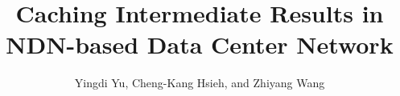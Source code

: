 \documentclass[journal]{IEEEtran}
\begin{document}
\title{Caching Intermediate Results in NDN-based Data Center Network}

\author{Yingdi Yu,
  Cheng-Kang Hsieh,
  and Zhiyang Wang}

\maketitle









\end{document}
